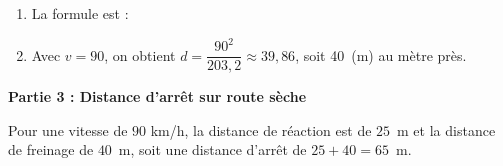 
\medskip

\begin{enumerate}
\item %

La formule est : 
\item %

Avec $v = 90$, on obtient $d = \dfrac{90^2}{203,2} \approx 39,86$, soit 40~(m) au mètre près.
\end{enumerate}

\bigskip

\textbf{Partie 3 : Distance d'arrêt sur route sèche}

\medskip



Pour une vitesse de $90$ km/h, la distance de réaction est de $25$~m et la distance de freinage de $40$~m, soit une distance d'arrêt de $25 + 40 = 65$~m.
\bigskip

